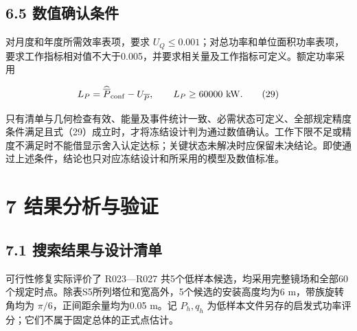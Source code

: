 \documentclass[UTF8,fontset=windows,zihao=-4]{ctexart}
\begin{document}
\subsection*{6.5 数值确认条件}

\par\noindent\begin{minipage}{\linewidth}
对月度和年度所需效率表项，要求 \(U_Q\le0.001\)；对总功率和单位面积功率表项，要求工作指标相对值不大于0.005，并要求相关量及工作指标可定义。额定功率采用

\[
L_P=\widehat{\overline P}_{\rm conf}-U_{\overline P},
\qquad L_P\ge60000\ \mathrm{kW}.
\tag{29}
\]
\end{minipage}\par

只有清单与几何检查有效、能量及事件统计一致、必需状态可定义、全部规定精度条件满足且式（29）成立时，才将冻结设计判为通过数值确认。工作下限不足或精度不满足时不能借显示舍入认定达标；关键状态未解决时应保留未决结论。即使通过上述条件，结论也只对应冻结设计和所采用的模型及数值标准。

\section*{7 结果分析与验证}

\subsection*{7.1 搜索结果与设计清单}

可行性修复实际评价了 R023—R027 共5个低样本候选，均采用完整镜场和全部60个规定时点。除表S5所列塔位和宽高外，5个候选的安装高度均为6 m，带族旋转角均为 \(\pi/6\)，正间距余量均为0.05 m。记 \(P_h,q_h\) 为低样本文件另存的启发式功率评分；它们不属于固定总体的正式点估计。
\end{document}
